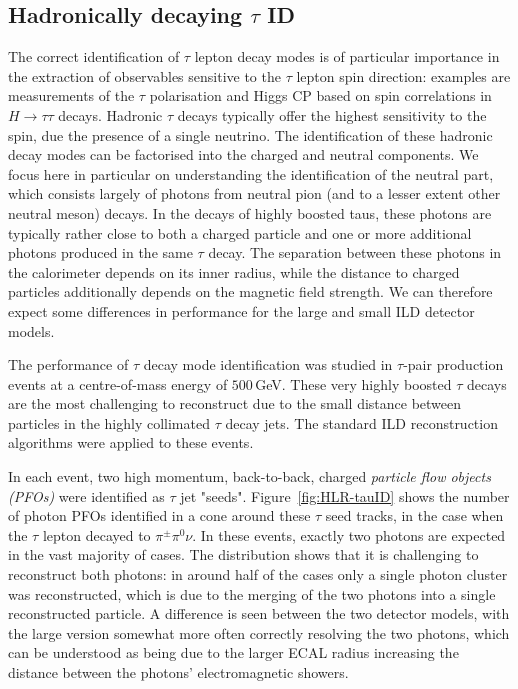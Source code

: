 \subsection[Hadronically decaying tau ID]{Hadronically decaying {\protect$\tau$ ID}}
\label{sec:perf:hlr:tau}

The correct identification of $\tau$ lepton decay modes is of particular importance in the extraction of observables sensitive to the $\tau$ lepton spin direction: examples are measurements of the $\tau$ polarisation and Higgs CP based on spin correlations in $H \to \tau \tau$ decays.
Hadronic $\tau$ decays typically offer the highest sensitivity to the spin, due the presence of a single neutrino. 
The identification of these hadronic decay modes can be factorised into the charged and neutral components. 
We focus here in particular on understanding the identification of the neutral part, which consists largely of photons from neutral pion (and to a lesser extent other neutral meson) decays. 
In the decays of highly boosted taus, these photons are typically rather close to both a charged particle and one or more additional photons produced in the same $\tau$ decay. 
The separation between these photons in the calorimeter depends on its inner radius, while the distance to charged particles additionally depends on the magnetic field strength. 
We can therefore expect some differences in performance for the large and small ILD detector models.

The performance of $\tau$ decay mode identification was studied in $\tau$-pair production events at a centre-of-mass energy of $500$\,GeV. 
These very highly boosted $\tau$ decays are the most challenging to reconstruct due to the small distance between particles in the highly collimated $\tau$ decay jets.
The standard ILD reconstruction algorithms were applied to these events.

In each event, two high momentum, back-to-back, charged \emph{particle flow objects (PFOs)} were identified as $\tau$ jet "seeds". Figure~\ref{fig:HLR-tauID} shows the number of photon PFOs identified in a cone around these $\tau$ seed tracks, in the case when the $\tau$ lepton decayed to $\pi^\pm \pi^0 \nu$.
In these events, exactly two photons are expected in the vast majority of cases. 
The distribution shows that it is challenging to reconstruct both photons: in around half of the cases only a single photon cluster was reconstructed, which is due to the merging of the two photons into a single reconstructed particle. 
A difference is seen between the two detector models, with the large version somewhat more often correctly resolving the two photons, which can be understood as being due to the larger ECAL radius increasing the distance between the photons' electromagnetic showers.


